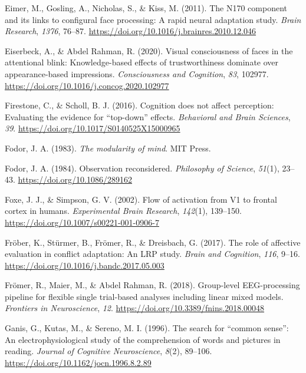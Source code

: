 \documentclass[
  english,
  man,floatsintext]{apa7}
\begin{document}
\leavevmode\hypertarget{ref-eimer2011}{}%
Eimer, M., Gosling, A., Nicholas, S., \& Kiss, M. (2011). The N170 component and its links to configural face processing: A rapid neural adaptation study. \emph{Brain Research}, \emph{1376}, 76--87. \url{https://doi.org/10.1016/j.brainres.2010.12.046}

\leavevmode\hypertarget{ref-eiserbeck2020}{}%
Eiserbeck, A., \& Abdel Rahman, R. (2020). Visual consciousness of faces in the attentional blink: Knowledge-based effects of trustworthiness dominate over appearance-based impressions. \emph{Consciousness and Cognition}, \emph{83}, 102977. \url{https://doi.org/10.1016/j.concog.2020.102977}

\leavevmode\hypertarget{ref-firestone2016}{}%
Firestone, C., \& Scholl, B. J. (2016). Cognition does not affect perception: Evaluating the evidence for ``top-down'' effects. \emph{Behavioral and Brain Sciences}, \emph{39}. \url{https://doi.org/10.1017/S0140525X15000965}

\leavevmode\hypertarget{ref-fodor1983}{}%
Fodor, J. A. (1983). \emph{The modularity of mind}. MIT Press.

\leavevmode\hypertarget{ref-fodor1984}{}%
Fodor, J. A. (1984). Observation reconsidered. \emph{Philosophy of Science}, \emph{51}(1), 23--43. \url{https://doi.org/10.1086/289162}

\leavevmode\hypertarget{ref-foxe2002}{}%
Foxe, J. J., \& Simpson, G. V. (2002). Flow of activation from V1 to frontal cortex in humans. \emph{Experimental Brain Research}, \emph{142}(1), 139--150. \url{https://doi.org/10.1007/s00221-001-0906-7}

\leavevmode\hypertarget{ref-fruxf6ber2017}{}%
Fröber, K., Stürmer, B., Frömer, R., \& Dreisbach, G. (2017). The role of affective evaluation in conflict adaptation: An LRP study. \emph{Brain and Cognition}, \emph{116}, 9--16. \url{https://doi.org/10.1016/j.bandc.2017.05.003}

\leavevmode\hypertarget{ref-fruxf6mer2018}{}%
Frömer, R., Maier, M., \& Abdel Rahman, R. (2018). Group-level EEG-processing pipeline for flexible single trial-based analyses including linear mixed models. \emph{Frontiers in Neuroscience}, \emph{12}. \url{https://doi.org/10.3389/fnins.2018.00048}

\leavevmode\hypertarget{ref-ganis1996}{}%
Ganis, G., Kutas, M., \& Sereno, M. I. (1996). The search for ``common sense'': An electrophysiological study of the comprehension of words and pictures in reading. \emph{Journal of Cognitive Neuroscience}, \emph{8}(2), 89--106. \url{https://doi.org/10.1162/jocn.1996.8.2.89}
\end{document}
